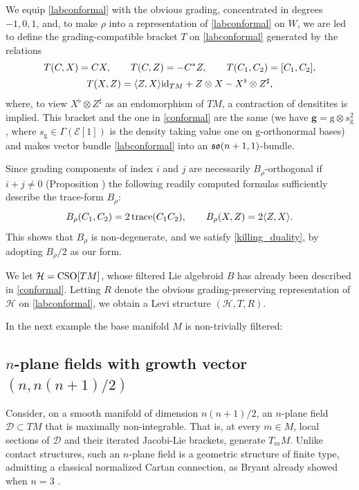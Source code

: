 \documentclass[leqno,12pt]{amsart} %
\newcommand{\confmetric}{{\mathrm{\mathbf{g}}}}
\begin{document}
  We equip \eqref{labconformal} with the obvious grading, concentrated in degrees
  $-1, 0, 1$, and, to make $\rho $ into a representation of \eqref{labconformal} on $W$,
  we are led to define the grading-compatible bracket $T$ on \eqref{labconformal}
  generated by the relations
  \begin{gather*}
    T(C, X) = CX, \qquad T(C, Z) = -C^*Z, \qquad T(C_1, C_2) = [C_1, C_2],\\
    T(X, Z) = \langle Z, X\rangle \mathrm{id}_{TM} + Z \otimes X - X^\flat \otimes Z^\sharp,
  \end{gather*}
  where, to view $X^\flat \otimes Z^\sharp$ as an endomorphism of $TM$, a contraction of
  densitites is implied. This bracket and the one in \ref{conformal} are the same (we have
  $\confmetric = \mathrm{g} \otimes s_{\mathrm{g}}^2$, where
  $s_{\mathrm{g}} \in \Gamma({\mathcal E}[1])$ is the density taking value one on
  ${\mathrm g}$-orthonormal bases) and makes vector bundle \eqref{labconformal} into an
  $\mathfrak{so}(n + 1, 1)$-bundle.

  Since grading components of index $i$ and $j$ are necessarily $B_\rho$-orthogonal if
  $i + j \ne 0$ (Proposition ) the following readily computed formulas
  sufficiently describe the trace-form $B_\rho $:
  \begin{equation*}
    B_\rho(C_1, C_2) = 2\operatorname{trace}(C_1C_2), \qquad  B_\rho(X, Z) = 2\langle Z, X \rangle.
  \end{equation*}
  This shows that $B_\rho$ is non-degenerate, and we satisfy \eqref{killing_duality}, by
  adopting $B_\rho/2$ as our form.

  We let ${\mathcal H} = \operatorname{\operatorname{CSO}}[TM]$, whose filtered Lie algebroid $B$ has already been
  described in \ref{conformal}. Letting $R$ denote the obvious grading-preserving
  representation of ${\mathcal H} $ on \eqref{labconformal}, we obtain a Levi structure
  $({\mathcal H}, T, R)$.

\vspace{\baselineskip}
In the next example the base manifold $M$ is non-trivially filtered:

\subsection{$n$-plane fields with growth vector $(n, n(n +1)/2)$}
Consider, on a smooth manifold of dimension $n(n + 1)/2$, an $n$-plane field
${\mathcal D} \subset TM$ that is maximally non-integrable. That is, at every $m \in M$,
local sections of ${\mathcal D} $ and their iterated Jacobi-Lie brackets, generate
$T_mM$. Unlike contact structures, such an $n$-plane field is a geometric structure of
finite type, admitting a classical normalized Cartan connection, as Bryant already showed
when $n=3$ \cite{bryant_79,bryant_2006}.
\end{document}
